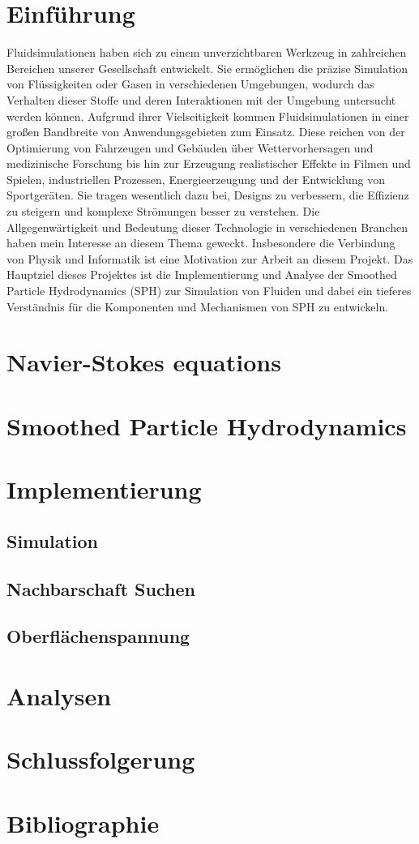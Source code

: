 \documentclass[a4paper, 12pt]{article}
\begin{document}
\makeTitleAndTable

\section{Einführung}
Fluidsimulationen haben sich zu einem unverzichtbaren Werkzeug in zahlreichen Bereichen unserer Gesellschaft entwickelt. Sie ermöglichen die präzise Simulation von Flüssigkeiten oder Gasen in verschiedenen Umgebungen, wodurch das Verhalten dieser Stoffe und deren Interaktionen mit der Umgebung untersucht werden können. Aufgrund ihrer Vielseitigkeit kommen Fluidsimulationen in einer großen Bandbreite von Anwendungsgebieten zum Einsatz. Diese reichen von der Optimierung von Fahrzeugen und Gebäuden über Wettervorhersagen und medizinische Forschung bis hin zur Erzeugung realistischer Effekte in Filmen und Spielen, industriellen Prozessen, Energieerzeugung und der Entwicklung von Sportgeräten. Sie tragen wesentlich dazu bei, Designs zu verbessern, die Effizienz zu steigern und komplexe Strömungen besser zu verstehen. Die Allgegenwärtigkeit und Bedeutung dieser Technologie in verschiedenen Branchen haben mein Interesse an diesem Thema geweckt. Insbesondere die Verbindung von Physik und Informatik ist eine Motivation zur Arbeit an diesem Projekt.
Das Hauptziel dieses Projektes ist die Implementierung und Analyse der Smoothed Particle Hydrodynamics (SPH) zur Simulation von Fluiden und dabei ein tieferes Verständnis für die Komponenten und Mechanismen von SPH zu entwickeln.

\section{Navier-Stokes equations}

\section{Smoothed Particle Hydrodynamics}

\section{Implementierung}
\subsection{Simulation}
\subsection{Nachbarschaft Suchen}
\subsection{Oberflächenspannung}

\section{Analysen}

\section{Schlussfolgerung}

\section{Bibliographie}
\end{document}
